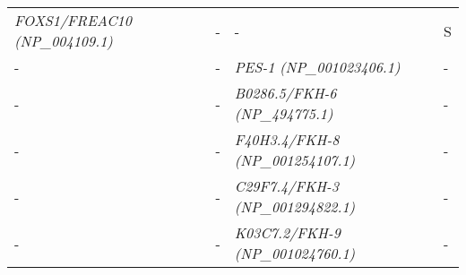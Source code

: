 \documentclass[../main.tex]{subfiles}
\begin{document}
\begin{longtable}{llll}
	\textit{FOXS1/FREAC10 (NP\_004109.1)}                   & -                                                                                                      & -                                                                                                  & S                     \\ [0.1cm]
	-                                                       & -                                                                                                      & \textit{PES-1 (NP\_001023406.1)}                                                                   & -                     \\ [0.1cm]
	-                                                       & -                                                                                                      & \textit{B0286.5/FKH-6 (NP\_494775.1)}                                                              & -                     \\ [0.1cm]
	-                                                       & -                                                                                                      & \textit{F40H3.4/FKH-8 (NP\_001254107.1)}                                                           & -                     \\ [0.1cm]
	-                                                       & -                                                                                                      & \textit{C29F7.4/FKH-3 (NP\_001294822.1)}                                                           & -                     \\ [0.1cm]
	-                                                       & -                                                                                                      & \textit{K03C7.2/FKH-9 (NP\_001024760.1)}                                                           & -                     \\* \bottomrule \bottomrule
\end{longtable}
\end{document}
